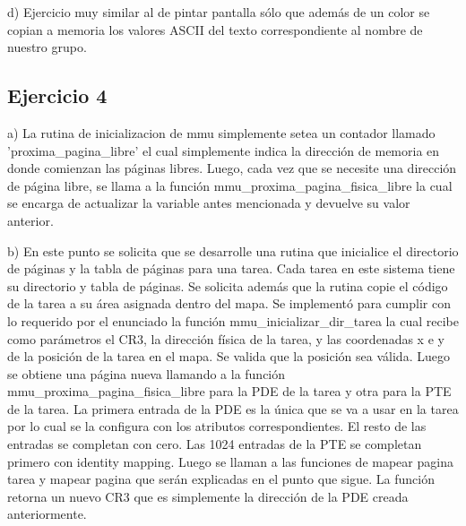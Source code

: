 \documentclass[a4paper]{article}
\begin{document}
d) Ejercicio muy similar al de pintar pantalla sólo que además de un color se copian a memoria los valores ASCII del texto correspondiente al nombre de nuestro grupo.


\subsection{Ejercicio 4}
a) La rutina de inicializacion de mmu simplemente setea un contador llamado 'proxima_pagina_libre' el cual simplemente indica la dirección de memoria en donde comienzan las páginas libres. Luego, cada vez que se necesite una dirección de página libre, se llama a la función mmu_proxima_pagina_fisica_libre la cual se encarga de actualizar la variable antes mencionada y devuelve su valor anterior.

b) En este punto se solicita que se desarrolle una rutina que inicialice el directorio de páginas y la tabla de páginas para una tarea. Cada tarea en este sistema tiene su directorio y tabla de páginas. Se solicita además que la rutina copie el código de la tarea a su área asignada dentro del mapa. Se implementó para cumplir con lo requerido por el enunciado la función mmu_inicializar_dir_tarea la cual recibe como parámetros el CR3, la dirección física de la tarea, y las coordenadas x e y de la posición de la tarea en el mapa. Se valida que la posición sea válida. Luego se obtiene una página nueva llamando a la función mmu_proxima_pagina_fisica_libre para la PDE de la tarea y otra para la PTE de la tarea. La primera entrada de la PDE es la única que se va a usar en la tarea por lo cual se la configura con los atributos correspondientes. El resto de las entradas se completan con cero. Las 1024 entradas de la PTE se completan primero con identity mapping. Luego se llaman a las funciones de mapear pagina tarea y mapear pagina que serán explicadas en el punto que sigue. La función retorna un nuevo CR3 que es simplemente la dirección de la PDE creada anteriormente.
\end{document}
